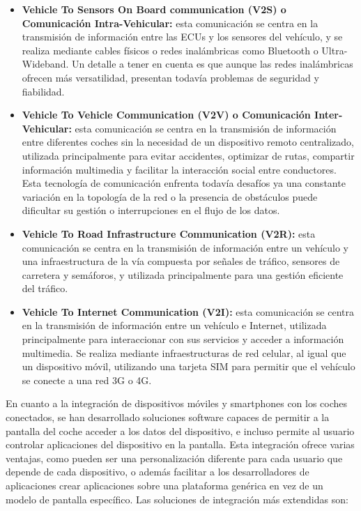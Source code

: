 \documentclass[12pt]{report} %
\begin{document}
\begin{itemize}

    \item \textbf{Vehicle To Sensors On Board communication (V2S) o Comunicación Intra-Vehicular:} esta comunicación se centra en la transmisión de información entre las ECUs y los sensores del vehículo, y se realiza mediante cables físicos o redes inalámbricas como Bluetooth o Ultra-Wideband. Un detalle a tener en cuenta es que aunque las redes inalámbricas ofrecen más versatilidad, presentan todavía problemas de seguridad y fiabilidad.
    \item \textbf{Vehicle To Vehicle Communication (V2V) o Comunicación Inter-Vehicular:} esta comunicación se centra en la transmisión de información entre diferentes coches sin la necesidad de un dispositivo remoto centralizado, utilizada principalmente para evitar accidentes, optimizar de rutas, compartir información multimedia y facilitar la interacción social entre conductores. Esta tecnología de comunicación enfrenta todavía desafíos ya una constante variación en la topología de la red o la presencia de obstáculos puede dificultar su gestión o interrupciones en el flujo de los datos.
    \item \textbf{Vehicle To Road Infrastructure Communication (V2R):} esta comunicación se centra en la transmisión de información entre un vehículo y una infraestructura de la vía compuesta por señales de tráfico, sensores de carretera y semáforos, y utilizada principalmente para una gestión eficiente del tráfico.
    \item \textbf{Vehicle To Internet Communication (V2I):} esta comunicación se centra en la transmisión de información entre un vehículo e Internet, utilizada principalmente para interaccionar con sus servicios y acceder a información multimedia. Se realiza mediante infraestructuras de red celular, al igual que un dispositivo móvil, utilizando una tarjeta SIM para permitir que el vehículo se conecte a una red 3G o 4G.

\end{itemize}

En cuanto a la integración de dispositivos móviles y smartphones con los coches conectados, se han desarrollado soluciones software capaces de permitir a la pantalla del coche acceder a los datos del dispositivo, e incluso permite al usuario controlar aplicaciones del dispositivo en la pantalla. Esta integración ofrece varias ventajas, como pueden ser una personalización diferente para cada usuario que depende de cada dispositivo, o además facilitar a los desarrolladores de aplicaciones crear aplicaciones sobre una plataforma genérica en vez de un modelo de pantalla específico. Las soluciones de integración más extendidas son: 
\end{document}
